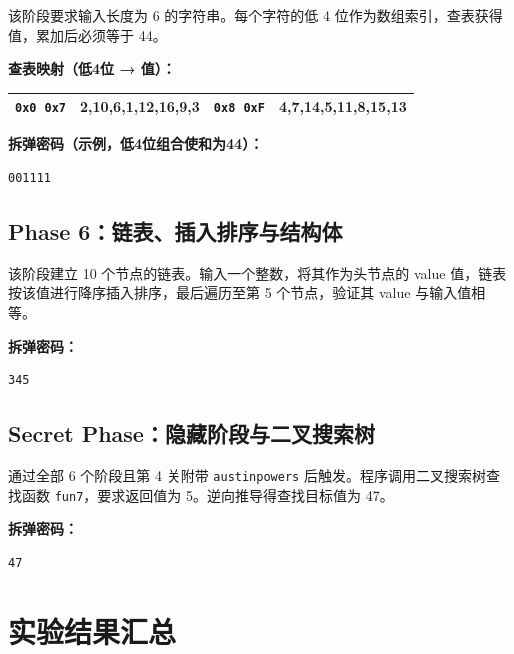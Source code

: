 \documentclass[12pt, a4paper]{academics}
\begin{document}
该阶段要求输入长度为 6 的字符串。每个字符的低 4 位作为数组索引，查表获得值，累加后必须等于 44。

\textbf{查表映射（低4位 → 值）：}

\begin{center}
\begin{tabular}{|c|c|c|c|}
\hline
\texttt{0x0}~\texttt{0x7} & 2,10,6,1,12,16,9,3 & \texttt{0x8}~\texttt{0xF} & 4,7,14,5,11,8,15,13 \\
\hline
\end{tabular}
\end{center}

\textbf{拆弹密码（示例，低4位组合使和为44）：}
\begin{verbatim}
001111
\end{verbatim}

\subsection{Phase 6：链表、插入排序与结构体}

该阶段建立 10 个节点的链表。输入一个整数，将其作为头节点的 value 值，链表按该值进行降序插入排序，最后遍历至第 5 个节点，验证其 value 与输入值相等。

\textbf{拆弹密码：}
\begin{verbatim}
345
\end{verbatim}

\subsection{Secret Phase：隐藏阶段与二叉搜索树}

通过全部 6 个阶段且第 4 关附带 \texttt{austinpowers} 后触发。程序调用二叉搜索树查找函数 \texttt{fun7}，要求返回值为 5。逆向推导得查找目标值为 47。

\textbf{拆弹密码：}
\begin{verbatim}
47
\end{verbatim}

\section{实验结果汇总}
\end{document}
